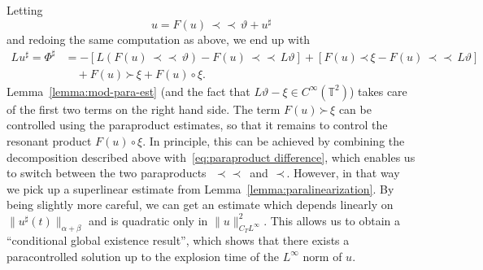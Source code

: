 \documentclass[a4paper,11pt]{article}
\newcommand{\mathD}{\mathrm{D}}
\theoremstyle{remark}
\newcommand{\CC}{\ensuremath{\mathscr{C}}}
\newcommand{\lpara}{\,\mathord{\prec}\,}
\newcommand{\rpara}{\,\mathord{\succ}\,}
\newcommand{\reso}{\,\mathord{\circ}\,}
\newcommand{\mpara}{\,\mathord{\prec\!\!\!\prec}\,}
\begin{document}
Letting
\begin{equation}\label{eq:mod-paracontrolled}
  u=F ( u ) \mpara \vartheta +u^{\sharp}
\end{equation}
and redoing the same computation as above, we end up with
\begin{align}\label{eq:phi sharp def pam} \nonumber
   L u^{\sharp} = \Phi^{\sharp} & = - [ L (F ( u )  \mpara \vartheta) - F(u) \mpara L\vartheta]  + [ F ( u ) \lpara \xi -F ( u ) \mpara L\vartheta ] \\
   &\quad + F ( u ) \rpara \xi + F(u) \reso \xi. %
\end{align}
Lemma~\ref{lemma:mod-para-est} (and the fact that $L\vartheta - \xi \in C^\infty(\mathbb{T}^2)$) takes care of the first two terms on the right hand side. The term $F(u) \rpara \xi$ can be controlled using the paraproduct estimates, so that it remains to control the resonant product $F(u) \reso \xi$. In principle, this can be achieved by combining the decomposition described above with~\eqref{eq:paraproduct difference}, which enables us to switch between the two paraproducts~$\mpara$ and~$\lpara$. However, in that way we pick up a superlinear estimate from Lemma~\ref{lemma:paralinearization}. By being slightly more careful, we can get an estimate which depends linearly on $\|u^\sharp(t)\|_{\alpha+\beta}$ and is quadratic only in $\|u\|_{C_T L^\infty}^2$. This allows us to obtain a ``conditional global existence result'', which shows that there exists a paracontrolled solution up to the explosion time of the $L^\infty$ norm of $u$.
\end{document}
